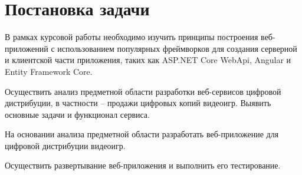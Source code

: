\section{Постановка задачи}
\label{sec:practice:task_statement}

В рамках курсовой работы необходимо изучить принципы построения веб-приложений с использованием популярных фреймворков для создания
серверной и клиентской части приложения, таких как ASP.NET Core WebApi, Angular и Entity Framework Core. 

Осуществить анализ предметной области разработки веб-сервисов цифровой дистрибуции, в частности -- продажи цифровых копий видеоигр.
Выявить основные задачи и функционал сервиса.

На основании анализа предметной области разработать веб-приложение для цифровой дистрибуции видеоигр.

Осуществить развертывание веб-приложения и выполнить его тестирование.

